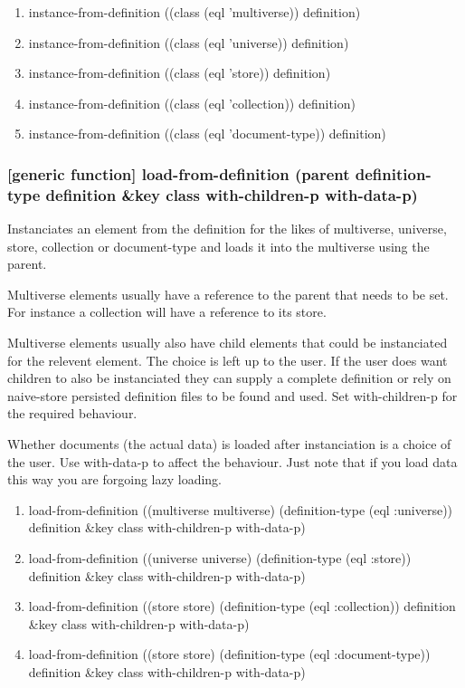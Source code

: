 \documentclass[11pt]{article}
\begin{document}
\begin{enumerate}
\item instance-from-definition ((class (eql 'multiverse)) definition)
\label{sec:orgc7f3b21}
\item instance-from-definition ((class (eql 'universe)) definition)
\label{sec:org49c5ca1}
\item instance-from-definition ((class (eql 'store)) definition)
\label{sec:org831ac56}
\item instance-from-definition ((class (eql 'collection)) definition)
\label{sec:orgdcffdb0}
\item instance-from-definition ((class (eql 'document-type)) definition)
\label{sec:org5e66a7b}
\end{enumerate}

\subsubsection{[generic function] load-from-definition (parent definition-type definition \&key class with-children-p with-data-p)}
\label{sec:org36d11bc}

Instanciates an element from the definition for the likes of
multiverse, universe, store, collection or document-type and loads it
into the multiverse using the parent.

Multiverse elements usually have a reference to the parent that needs
to be set. For instance a collection will have a reference to its
store.

Multiverse elements usually also have child elements that could be
instanciated for the relevent element. The choice is left up to the
user. If the user does want children to also be instanciated they can
supply a complete definition or rely on naive-store persisted
definition files to be found and used. Set with-children-p for the
required behaviour.

Whether documents (the actual data) is loaded after instanciation is a
choice of the user. Use with-data-p to affect the behaviour. Just note
that if you load data this way you are forgoing lazy loading.

\begin{enumerate}
\item load-from-definition ((multiverse multiverse) (definition-type (eql :universe)) definition \&key class with-children-p with-data-p)
\label{sec:org70011b9}
\item load-from-definition ((universe universe) (definition-type (eql :store)) definition \&key class with-children-p with-data-p)
\label{sec:orgd4c2190}
\item load-from-definition ((store store) (definition-type (eql :collection)) definition \&key class with-children-p with-data-p)
\label{sec:org739a126}
\item load-from-definition ((store store) (definition-type (eql :document-type)) definition \&key class with-children-p with-data-p)
\label{sec:org94a0cda}
\end{enumerate}
\end{document}
